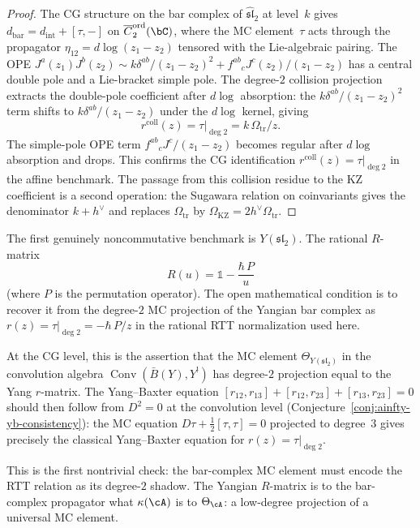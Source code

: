 \begin{proof}
The CG structure on the bar complex of
$\hat{\mathfrak{sl}}_2$ at level~$k$ gives
$d_{\mathrm{bar}} = d_{\mathrm{int}} + [\tau, -]$ on
$\overline{C}_2^{\mathrm{ord}}(\bC)$, where the MC element~$\tau$
acts through the propagator $\eta_{12} = d\log(z_1 - z_2)$
tensored with the Lie-algebraic pairing.
The OPE
$J^a(z_1) J^b(z_2) \sim k\delta^{ab}/(z_1-z_2)^2
+ f^{ab}{}_{c} J^c(z_2)/(z_1-z_2)$
has a central double pole and a Lie-bracket simple pole. The
degree-$2$ collision projection extracts the double-pole coefficient after
$d\log$ absorption: the $k\delta^{ab}/(z_1-z_2)^2$ term shifts
to $k\delta^{ab}/(z_1-z_2)$ under the $d\log$ kernel,
giving
\[
r^{\mathrm{coll}}(z)=\tau|_{\deg 2}
= k\,\Omega_{\mathrm{tr}}/z .
\]
The simple-pole OPE term $f^{ab}{}_{c}J^c/(z_1-z_2)$ becomes
regular after $d\log$ absorption and drops.
This confirms the CG identification
$r^{\mathrm{coll}}(z)=\tau|_{\deg 2}$ in the affine benchmark.
The passage from this collision residue to the KZ coefficient is a
second operation: the Sugawara relation on coinvariants gives the
denominator $k+h^\vee$ and replaces $\Omega_{\mathrm{tr}}$ by
$\Omega_{\mathrm{KZ}}=2h^\vee\Omega_{\mathrm{tr}}$.
\end{proof}

\begin{remark}
\label{rem:yangian-propagator-benchmark}
The first genuinely noncommutative benchmark is $Y(\mathfrak{sl}_2)$.
The rational $R$-matrix
\[
R(u) = \mathbb{1} - \frac{\hbar\, P}{u}
\]
(where $P$ is the permutation operator). The open mathematical condition is to
recover it from the degree-$2$ MC projection of the Yangian bar complex
as $r(z) = \tau|_{\deg 2} = -\hbar\, P / z$ in the
rational RTT normalization used here.

At the CG level, this is the assertion that the MC element
$\Theta_{Y(\mathfrak{sl}_2)}$ in the convolution algebra
$\operatorname{Conv}(\bar B(Y), Y^!)$ has degree-$2$ projection equal to
the Yang $r$-matrix. The Yang--Baxter equation
$[r_{12}, r_{13}] + [r_{12}, r_{23}] + [r_{13}, r_{23}] = 0$
should then follow from $D^2 = 0$ at the convolution level
(Conjecture~\ref{conj:ainfty-yb-consistency}): the MC equation
$D\tau + \tfrac{1}{2}[\tau,\tau] = 0$ projected to degree~$3$ gives
precisely the classical Yang--Baxter equation for $r(z) =
\tau|_{\deg 2}$.

This is the first nontrivial check: the bar-complex MC element must
encode the RTT relation as its degree-$2$ shadow. The Yangian
$R$-matrix is to the bar-complex propagator what $\kappa(\cA)$ is
to $\Theta_\cA$: a low-degree projection of a universal MC
element.
\end{remark}

